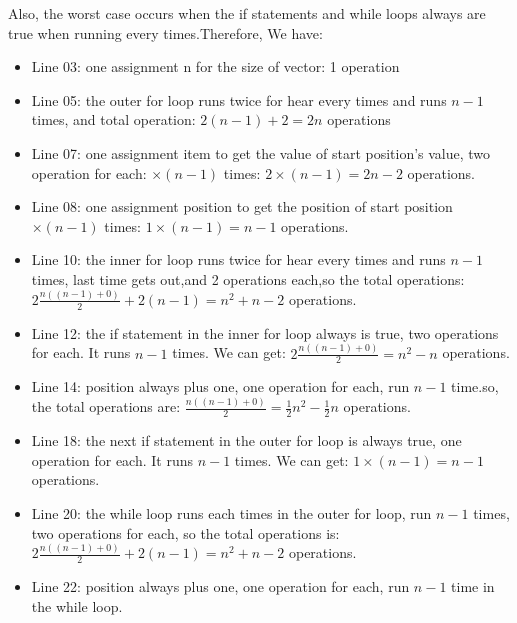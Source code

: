 \documentclass[11pt]{article}
\begin{document}
Also, the worst case occurs when the if statements and while loops 
always are true when running every times.Therefore, We have:
\begin{itemize}
 \item Line 03: one assignment n for the size of vector: 1 operation
 \item Line 05: the outer for loop runs twice for hear every times  
                  and runs $n - 1$ times, and total operation: 
                  $2(n-1) + 2 = 2n$ operations
 \item Line 07: one assignment item to get the value of start 
                  position's value, two operation for each: 
                  $\times (n - 1)$ times: $2 \times (n - 1) = 2n - 2$
                  operations.
 \item Line 08: one assignment position to get the position of start 
                  position$\times (n - 1)$ times: $1 \times (n - 1) 
                  = n - 1$ operations.
 \item Line 10: the inner for loop runs twice for hear every times  
                  and runs $n - 1$ times, last time gets out,and 2 
                  operations each,so the total operations: 
                  $2\frac{n((n-1) + 0)}{2} + 2(n - 1)= n^{2} + n - 2$
                  operations.
 \item Line 12: the if statement in the inner for loop always is 
                  true, two operations for each. It runs $n-1$ 
                  times. We can get: $2\frac{n((n-1) + 0)}{2} = 
                  n^{2} - n$ operations.
 \item Line 14: position always plus one, one operation for each, 
                  run $n - 1$ time.so, the total operations are: 
                  $\frac{n((n - 1) + 0)}{2} = \frac{1}{2}n^{2}-
                  \frac{1}{2}n$ operations.
 \item Line 18: the next if statement in the outer for loop is always  
                  true, one operation for each. It runs $n - 1$ times. 
                  We can get: $1 \times (n - 1) = n - 1$ operations.
 \item Line 20:  the while loop runs each times in the outer for loop, 
                   run $n-1$ times, two operations for each, so the 
                   total operations is: $2\frac{n((n-1) + 0)}{2} 
                   + 2(n - 1) = n^{2} + n - 2$ operations. 
 \item Line 22:  position always plus one, one operation for each, 
                   run $n - 1$ time in the while loop.

\end{itemize}
\end{document}
